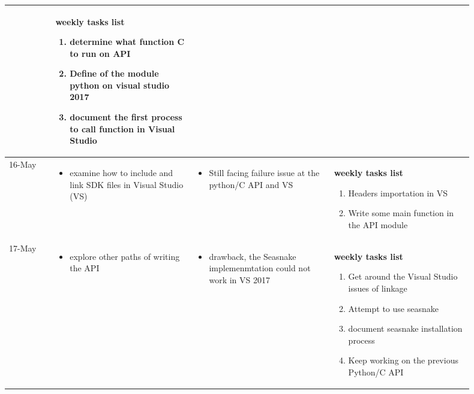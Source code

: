 \begin{longtable}{|l|p{0.3\linewidth}|p{0.3\linewidth}|p{0.3\linewidth}|}
			&
			\textbf{ weekly tasks list}
	\begin{enumerate}
	\item  determine what function C to run on API  
	\item Define of the module python on visual studio 2017  
	\item document the first process to call function in Visual Studio
	\
	\end{enumerate}

			\\\hline
			
					16-May	&
\begin{itemize}
\item  examine how to include and link SDK files in Visual Studio (VS)
\end{itemize}
			&
\begin{itemize}
\item  Still facing failure issue at the python/C API and VS  
\end{itemize}			
			
			&
			\textbf{ weekly tasks list}
	\begin{enumerate}
	\item  Headers importation in VS
	\item  Write some main function in the API module
	 
	\end{enumerate}

			\\\hline
			
					17-May	&
\begin{itemize}
\item  explore other paths of writing the API 
\end{itemize}
			&
\begin{itemize}
\item drawback, the Seasnake  implemenmtation could not work in VS 2017
\end{itemize}			
			
			&
			\textbf{ weekly tasks list}
	\begin{enumerate}
	\item Get around the Visual Studio issues of  linkage
	\item Attempt to use seasnake 
	\item document seasnake installation process
	\item Keep working on the previous Python/C API
	\end{enumerate}


\end{longtable}
